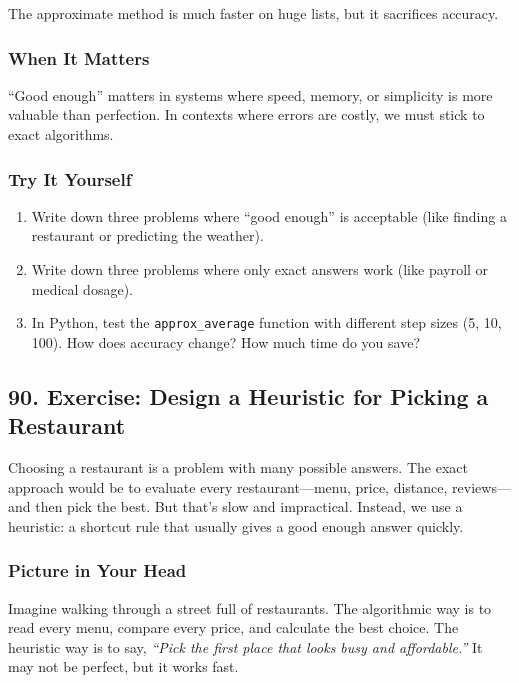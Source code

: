 \documentclass[
  letterpaper,
  DIV=11,
  numbers=noendperiod]{scrreprt}
\providecommand{\tightlist}{%
  \setlength{\itemsep}{0pt}\setlength{\parskip}{0pt}}
\begin{document}
The approximate method is much faster on huge lists, but it sacrifices
accuracy.

\subsubsection{When It Matters}\label{when-it-matters-87}

``Good enough'' matters in systems where speed, memory, or simplicity is
more valuable than perfection. In contexts where errors are costly, we
must stick to exact algorithms.

\subsubsection{Try It Yourself}\label{try-it-yourself-89}

\begin{enumerate}
\def\labelenumi{\arabic{enumi}.}
\tightlist
\item
  Write down three problems where ``good enough'' is acceptable (like
  finding a restaurant or predicting the weather).
\item
  Write down three problems where only exact answers work (like payroll
  or medical dosage).
\item
  In Python, test the \texttt{approx\_average} function with different
  step sizes (5, 10, 100). How does accuracy change? How much time do
  you save?
\end{enumerate}

\subsection{90. Exercise: Design a Heuristic for Picking a
Restaurant}\label{exercise-design-a-heuristic-for-picking-a-restaurant}

Choosing a restaurant is a problem with many possible answers. The exact
approach would be to evaluate every restaurant---menu, price, distance,
reviews---and then pick the best. But that's slow and impractical.
Instead, we use a heuristic: a shortcut rule that usually gives a good
enough answer quickly.

\subsubsection{Picture in Your Head}\label{picture-in-your-head-90}

Imagine walking through a street full of restaurants. The algorithmic
way is to read every menu, compare every price, and calculate the best
choice. The heuristic way is to say, \emph{``Pick the first place that
looks busy and affordable.''} It may not be perfect, but it works fast.
\end{document}
